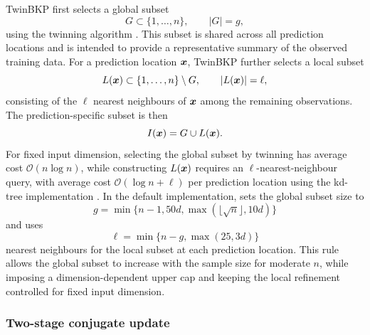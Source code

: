 \documentclass[article, shortnames]{jss}
\renewcommand{\vec}[1]{\mbox{\boldmath ${#1}$}}
\begin{document}
TwinBKP first selects a global subset
\[
G \subset \{1,\ldots,n\}, \qquad |G|=g,
\]
using the twinning algorithm \citep{Vakayil2022Twinning}. 
This subset is shared across all prediction locations and is intended to provide a representative summary of the observed training data. 
For a prediction location $\vec{x}$, TwinBKP further selects a local subset
\[
L(\vec{x}) \subset \{1,\ldots,n\}\setminus G, \qquad |L(\vec{x})|=\ell,
\]
consisting of the $\ell$ nearest neighbours of $\vec{x}$ among the remaining observations. 
The prediction-specific subset is then
\[
I(\vec{x}) = G\cup L(\vec{x}).
\] 
For fixed input dimension, selecting the global subset by twinning has average cost $\mathcal{O}(n\log n)$, while constructing $L(\vec{x})$ requires an $\ell$-nearest-neighbour query, with average cost $\mathcal{O}(\log n+\ell)$ per prediction location using the  kd-tree implementation \citep{Blanco2014nanoflann}.
In the default implementation,  sets the global subset size to 
\[
g=\min\{n-1,50d,\max(\lfloor\sqrt{n}\rfloor,10d)\}
\]
and uses 
\[
\ell=\min\{n-g,\max(25,3d)\}
\]
nearest neighbours for the local subset at each prediction location. 
This rule allows the global subset to increase with the sample size for moderate $n$, while imposing a dimension-dependent upper cap and keeping the local refinement controlled for fixed input dimension.

\subsubsection{Two-stage conjugate update}
\end{document}
